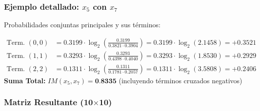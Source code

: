 \documentclass[12pt,a4paper]{article}
\begin{document}
\subsubsection{Ejemplo detallado: $x_5$ con $x_7$}
Probabilidades conjuntas principales y sus términos:

\begin{align*}
    \text{Term. } (0,0) &= 0.3199 \cdot \log_2\left(\frac{0.3199}{0.3821 \cdot 0.3904}\right) = 0.3199 \cdot \log_2(2.1458) = \mathbf{+0.3521} \\
    \text{Term. } (1,1) &= 0.3293 \cdot \log_2\left(\frac{0.3293}{0.4398 \cdot 0.4040}\right) = 0.3293 \cdot \log_2(1.8530) = \mathbf{+0.2929} \\
    \text{Term. } (2,2) &= 0.1311 \cdot \log_2\left(\frac{0.1311}{0.1781 \cdot 0.2057}\right) = 0.1311 \cdot \log_2(3.5808) = \mathbf{+0.2406}
\end{align*}
\textbf{Suma Total:} $IM(x_5, x_7) = \textbf{0.8335}$ (incluyendo términos cruzados negativos)

\subsubsection{Matriz Resultante (10$\times$10)}
\end{document}
